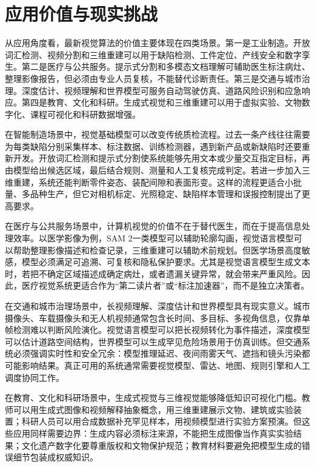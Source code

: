 \documentclass[UTF8,a4paper,12pt]{ctexart}
\newcommand{\model}[1]{\textsf{#1}}
\begin{document}
\section{应用价值与现实挑战}
从应用角度看，最新视觉算法的价值主要体现在四类场景。第一是工业制造。开放词汇检测、视频分割和三维重建可以用于缺陷检测、工件定位、产线安全和数字孪生。第二是医疗与公共服务。提示式分割和多模态文档理解可辅助医生标注病灶、整理影像报告，但必须由专业人员复核，不能替代诊断责任。第三是交通与城市治理。深度估计、视频理解和世界模型可服务自动驾驶仿真、道路风险识别和应急响应。第四是教育、文化和科研。生成式视觉和三维重建可以用于虚拟实验、文物数字化、课程可视化和科研数据增强。

在智能制造场景中，视觉基础模型可以改变传统质检流程。过去一条产线往往需要为每类缺陷分别采集样本、标注数据、训练检测器，遇到新产品或新缺陷时还要重新开发。开放词汇检测和提示式分割使系统能够先用文本或少量交互指定目标，再由模型给出候选区域，最后结合规则、测量和人工复核完成判定。若进一步加入三维重建，系统还能判断零件姿态、装配间隙和表面形变。这样的流程更适合小批量、多品种生产，但它对相机标定、光照稳定、缺陷样本管理和误报控制提出了更高要求。

在医疗与公共服务场景中，计算机视觉的价值不在于替代医生，而在于提高信息处理效率。以医学影像为例，\model{SAM 2}一类模型可以辅助轮廓勾画，视觉语言模型可以帮助整理影像描述和检查记录，三维重建可以辅助术前规划。但医学场景高度敏感，模型必须满足可追溯、可复核和隐私保护要求。尤其是视觉语言模型生成文本时，若把不确定区域描述成确定病灶，或者遗漏关键异常，就会带来严重风险。因此，医疗视觉系统更适合作为“第二读片者”或“标注加速器”，而不是独立决策者。

在交通和城市治理场景中，长视频理解、深度估计和世界模型具有现实意义。城市摄像头、车载摄像头和无人机视频通常包含长时间、多目标、多视角信息，仅靠单帧检测难以判断风险演化。视觉语言模型可以把长视频转化为事件描述，深度模型可以估计道路空间结构，世界模型可以生成罕见危险场景用于仿真训练。但交通系统必须强调实时性和安全冗余：模型推理延迟、夜间雨雾天气、遮挡和镜头污染都可能影响结果。真正可用的系统通常需要视觉模型、雷达、地图、规则引擎和人工调度协同工作。

在教育、文化和科研场景中，生成式视觉与三维视觉能够降低知识可视化门槛。教师可以用生成式图像和视频解释抽象概念，用三维重建展示文物、建筑或实验装置；科研人员可以用合成数据补充罕见样本，用视频模型进行实验方案预演。但这些应用同样需要边界：生成内容必须标注来源，不能把生成图像当作真实实验结果；文化遗产数字化要尊重版权和文物保护规范；教育材料要避免把模型生成的错误细节包装成权威知识。
\end{document}
